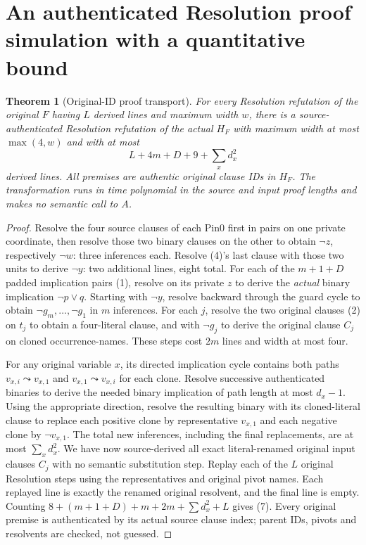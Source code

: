 \documentclass[11pt]{article}
\newtheorem{theorem}{Theorem}
\begin{document}
\section{An authenticated Resolution proof simulation with a quantitative bound}
\begin{theorem}[Original-ID proof transport]\label{th:proof}
For every Resolution refutation of the original $F$ having $L$ \emph{derived} lines and maximum width $w$, there is a source-authenticated Resolution refutation of the actual $H_F$ with maximum width at most $\max(4,w)$ and with at most
\[
 \boxed{L+4m+D+9+\sum_x d_x^2}\tag{7}
\]
derived lines. All premises are authentic original clause IDs in $H_F$. The transformation runs in time polynomial in the source and input proof lengths and makes no semantic call to $A$.
\end{theorem}
\begin{proof}
Resolve the four source clauses of each Pin0 first in pairs on one private coordinate, then resolve those two binary clauses on the other to obtain $\neg z$, respectively $\neg w$: three inferences each. Resolve (4)'s last clause with those two units to derive $\neg y$: two additional lines, eight total. For each of the $m+1+D$ padded implication pairs (1), resolve on its private $z$ to derive the \emph{actual} binary implication $\neg p\vee q$. Starting with $\neg y$, resolve backward through the guard cycle to obtain $\neg g_m,\ldots,\neg g_1$ in $m$ inferences. For each $j$, resolve the two original clauses (2) on $t_j$ to obtain a four-literal clause, and with $\neg g_j$ to derive the original clause $C_j$ on cloned occurrence-names. These steps cost $2m$ lines and width at most four.

For any original variable $x$, its directed implication cycle contains both paths $v_{x,i}\leadsto v_{x,1}$ and $v_{x,1}\leadsto v_{x,i}$ for each clone. Resolve successive authenticated binaries to derive the needed binary implication of path length at most $d_x-1$. Using the appropriate direction, resolve the resulting binary with its cloned-literal clause to replace each positive clone by representative $v_{x,1}$ and each negative clone by $\neg v_{x,1}$. The total new inferences, including the final replacements, are at most $\sum_x d_x^2$. We have now source-derived all exact literal-renamed original input clauses $C_j$ with no semantic substitution step. Replay each of the $L$ original Resolution steps using the representatives and original pivot names. Each replayed line is exactly the renamed original resolvent, and the final line is empty. Counting $8+(m+1+D)+m+2m+\sum d_x^2+L$ gives (7). Every original premise is authenticated by its actual source clause index; parent IDs, pivots and resolvents are checked, not guessed.
\end{proof}
\end{document}
